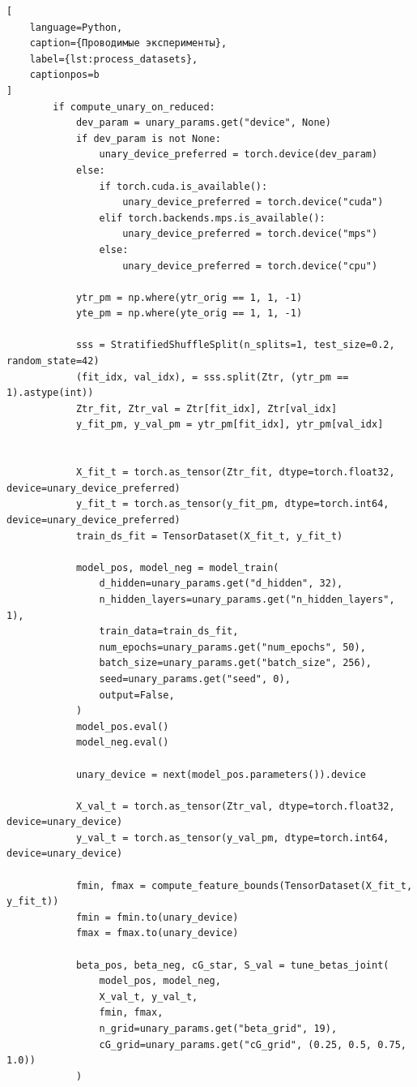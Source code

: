\documentclass[12pt,a4paper]{article}
\begin{document}
\begin{lstlisting}[
    language=Python,
    caption={Проводимые эксперименты},
    label={lst:process_datasets},
    captionpos=b
]
        if compute_unary_on_reduced:
            dev_param = unary_params.get("device", None)
            if dev_param is not None:
                unary_device_preferred = torch.device(dev_param)
            else:
                if torch.cuda.is_available():
                    unary_device_preferred = torch.device("cuda")
                elif torch.backends.mps.is_available():
                    unary_device_preferred = torch.device("mps")
                else:
                    unary_device_preferred = torch.device("cpu")

            ytr_pm = np.where(ytr_orig == 1, 1, -1)
            yte_pm = np.where(yte_orig == 1, 1, -1)

            sss = StratifiedShuffleSplit(n_splits=1, test_size=0.2, random_state=42)
            (fit_idx, val_idx), = sss.split(Ztr, (ytr_pm == 1).astype(int))
            Ztr_fit, Ztr_val = Ztr[fit_idx], Ztr[val_idx]
            y_fit_pm, y_val_pm = ytr_pm[fit_idx], ytr_pm[val_idx]


            X_fit_t = torch.as_tensor(Ztr_fit, dtype=torch.float32, device=unary_device_preferred)
            y_fit_t = torch.as_tensor(y_fit_pm, dtype=torch.int64, device=unary_device_preferred)
            train_ds_fit = TensorDataset(X_fit_t, y_fit_t)

            model_pos, model_neg = model_train(
                d_hidden=unary_params.get("d_hidden", 32),
                n_hidden_layers=unary_params.get("n_hidden_layers", 1),
                train_data=train_ds_fit,
                num_epochs=unary_params.get("num_epochs", 50),
                batch_size=unary_params.get("batch_size", 256),
                seed=unary_params.get("seed", 0),
                output=False,
            )
            model_pos.eval()
            model_neg.eval()

            unary_device = next(model_pos.parameters()).device 

            X_val_t = torch.as_tensor(Ztr_val, dtype=torch.float32, device=unary_device)
            y_val_t = torch.as_tensor(y_val_pm, dtype=torch.int64, device=unary_device)

            fmin, fmax = compute_feature_bounds(TensorDataset(X_fit_t, y_fit_t))
            fmin = fmin.to(unary_device)
            fmax = fmax.to(unary_device)

            beta_pos, beta_neg, cG_star, S_val = tune_betas_joint(
                model_pos, model_neg,
                X_val_t, y_val_t,
                fmin, fmax,
                n_grid=unary_params.get("beta_grid", 19),
                cG_grid=unary_params.get("cG_grid", (0.25, 0.5, 0.75, 1.0))
            )



\end{lstlisting}
\end{document}
